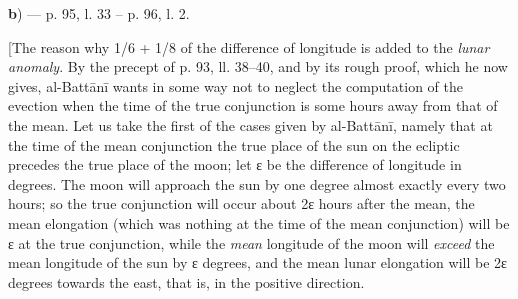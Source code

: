 \documentclass[11pt]{article}
\begin{document}
\par\begin{center}\textbf{b}) — p. 95, l. 33 – p. 96, l. 2.\end{center}
\par [The reason why 1/6 + 1/8 of the difference of longitude is added to the \emph{lunar anomaly}. By the precept of p. 93, ll. 38–40, and by its rough proof, which he now gives, al-Battānī wants in some way not to neglect the computation of the evection when the time of the true conjunction is some hours away from that of the mean. Let us take the first of the cases given by al-Battānī, namely that at the time of the mean conjunction the true place of the sun on the ecliptic precedes the true place of the moon; let {\greekfont ε} be the difference of longitude in degrees. The moon will approach the sun by one degree almost exactly every two hours; so the true conjunction will occur about 2{\greekfont ε} hours after the mean, the mean elongation (which was nothing at the time of the mean conjunction) will be {\greekfont ε} at the true conjunction, while the \emph{mean} longitude of the moon will \emph{exceed} the mean longitude of the sun by {\greekfont ε} degrees, and the mean lunar elongation will be 2{\greekfont ε} degrees towards the east, that is, in the positive direction.\par
\begin{center}\end{center}
\end{document}
